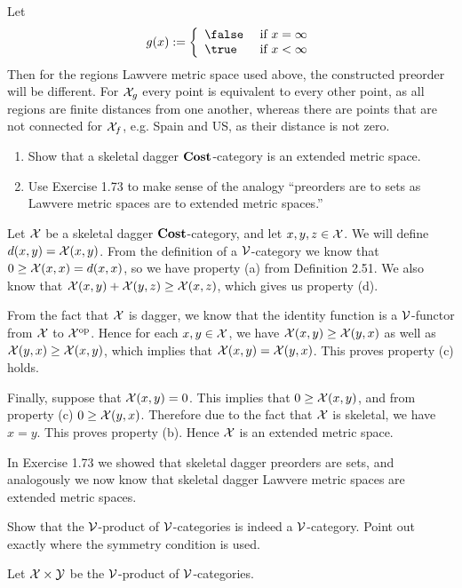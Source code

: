 \solution
Let
$$g(x):=\left\{\begin{array}{ll}\false & \text { if } x=\infty \\ \true & \text { if } x<\infty\end{array}\right.$$
Then for the regions Lawvere metric space used above, the constructed preorder will be different.  For $\mathcal{X}_g$ every point is equivalent to every other point, as all regions are finite distances from one another, whereas there are points that are not connected for $\mathcal{X}_f$, e.g. Spain and US, as their distance is not zero.

\begin{enumerate}
	\item Show that a skeletal dagger $\textbf{Cost}$-category is an extended metric space.
	\item Use Exercise 1.73 to make sense of the analogy ``preorders are to sets as Lawvere metric spaces are to extended metric spaces.''
\end{enumerate}

\solution
Let $\mathcal{X}$ be a skeletal dagger $\textbf{Cost}$-category, and let $x,y,z\in\mathcal{X}$.  We will define $d(x,y)=\mathcal{X}(x,y)$.  From the definition of a $\mathcal{V}$-category we know that $0\geq\mathcal{X}(x,x)=d(x,x)$, so we have property (a) from Definition 2.51.  We also know that $\mathcal{X}(x,y)+\mathcal{X}(y,z)\geq \mathcal{X}(x,z)$, which gives us property (d).

From the fact that $\mathcal{X}$ is dagger, we know that the identity function is a $\mathcal{V}$-functor from $\mathcal{X}$ to $\mathcal{X}^\textrm{op}$.  Hence for each $x,y\in\mathcal{X}$, we have $\mathcal{X}(x,y)\geq\mathcal{X}(y,x)$ as well as $\mathcal{X}(y,x)\geq\mathcal{X}(x,y)$, which implies that $\mathcal{X}(x,y)=\mathcal{X}(y,x)$.  This proves property (c) holds.

Finally, suppose that $\mathcal{X}(x,y)=0$.  This implies that $0\geq \mathcal{X}(x,y)$, and from property (c) $0\geq\mathcal{X}(y,x)$.  Therefore due to the fact that $\mathcal{X}$ is skeletal, we have $x=y$.  This proves property (b).  Hence $\mathcal{X}$ is an extended metric space.

In Exercise 1.73 we showed that skeletal dagger preorders are sets, and analogously we now know that skeletal dagger Lawvere metric spaces are extended metric spaces.

Show that the $\mathcal{V}$-product of $\mathcal{V}$-categories is indeed a $\mathcal{V}$-category.  Point out exactly where the symmetry condition is used.

\solution
Let $\mathcal{X}\times\mathcal{Y}$ be the $\mathcal{V}$-product of $\mathcal{V}$-categories.

